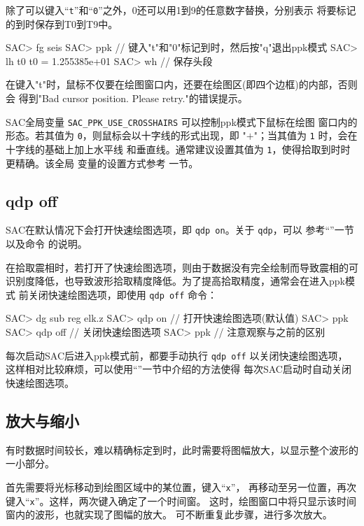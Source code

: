 除了可以键入``\texttt{t}''和``\texttt{0}''之外，0还可以用1到9的任意数字替换，分别表示
将要标记的到时保存到T0到T9中。

\begin{SACCode}
SAC> fg seis
SAC> ppk
// 键入"t"和"0"标记到时，然后按"q"退出ppk模式
SAC> lh t0
     t0 = 1.255385e+01
SAC> wh         // 保存头段
\end{SACCode}

\begin{note}
在键入"t"时，鼠标不仅要在绘图窗口内，还要在绘图区(即四个边框)的内部，否则会
得到"Bad cursor position. Please retry."的错误提示。
\end{note}

\begin{note}
SAC全局变量 \verb|SAC_PPK_USE_CROSSHAIRS| 可以控制ppk模式下鼠标在绘图
窗口内的形态。若其值为 \texttt{0}，则鼠标会以十字线的形式出现，即
"{\Large$+$}"；当其值为 \texttt{1} 时，会在十字线的基础上加上水平线
和垂直线。通常建议设置其值为 \texttt{1}，使得拾取到时时更精确。该全局
变量的设置方式参考  一节。
\end{note}

\subsection{qdp off}
SAC在默认情况下会打开快速绘图选项，即 \texttt{qdp on}。关于 \texttt{qdp}，可以
参考``''一节以及命令  的说明。

在拾取震相时，若打开了快速绘图选项，则由于数据没有完全绘制而导致震相的可
识别度降低，也导致波形拾取精度降低。为了提高拾取精度，通常会在进入ppk模式
前关闭快速绘图选项，即使用 \texttt{qdp off} 命令：
\begin{SACCode}
SAC> dg sub reg elk.z
SAC> qdp on     // 打开快速绘图选项(默认值)
SAC> ppk
SAC> qdp off    // 关闭快速绘图选项
SAC> ppk        // 注意观察与之前的区别
\end{SACCode}
每次启动SAC后进入ppk模式前，都要手动执行 \texttt{qdp off} 以关闭快速绘图选项，
这样相对比较麻烦，可以使用``''一节中介绍的方法使得
每次SAC启动时自动关闭快速绘图选项。

\subsection{放大与缩小}
有时数据时间较长，难以精确标定到时，此时需要将图幅放大，以显示整个波形的一小部分。

首先需要将光标移动到绘图区域中的某位置，键入``\texttt{x}''，
再移动至另一位置，再次键入``\texttt{x}''。这样，两次键入确定了一个时间窗。
这时，绘图窗口中将只显示该时间窗内的波形，也就实现了图幅的放大。
可不断重复此步骤，进行多次放大。

